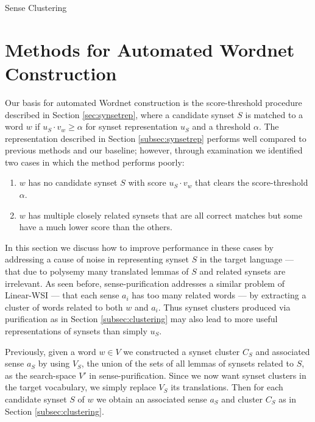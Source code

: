 \documentclass{book}
\begin{document}
\begin{algorithm}[H]
\label{alg:clustering}
\SetAlgoLined
\SetAlgoNoEnd
{}
\caption{Sense Clustering}
\end{algorithm}

\section{Methods for Automated Wordnet Construction}
\label{sec:wordnet}

Our basis for automated Wordnet construction is the score-threshold procedure described in Section \ref{sec:synsetrep}, where a candidate synset $S$ is matched to a word $w$ if $u_S\cdot v_w\ge\alpha$ for synset representation $u_S$ and a threshold $\alpha$.
The representation described in Section \ref{subsec:synsetrep} performs well compared to previous methods and our baseline;
however, through examination we identified two cases in which the method performs poorly: 
\begin{enumerate}
\item $w$ has no candidate synset $S$ with score $u_S\cdot v_w$ that clears the score-threshold $\alpha$.
\item $w$ has multiple closely related synsets that are all correct matches but some have a much lower score than the others.
\end{enumerate}
In this section we discuss how to improve performance in these cases by addressing a cause of noise in representing synset $S$ in the target language --- that due to polysemy many translated lemmas of $S$ and related synsets are irrelevant.
As seen before, sense-purification addresses a similar problem of Linear-WSI --- that each sense $a_i$ has too many related words --- by extracting a cluster of words related to both $w$ and $a_i$.
Thus synset clusters produced via purification as in Section \ref{subsec:clustering} may also lead to more useful representations of synsets than simply $u_S$.

Previously, given a word $w\in V$ we constructed a synset cluster $C_S$ and associated sense $a_S$ by using $V_S$, the union of the sets of all lemmas of synsets related to $S$, as the search-space $V'$ in sense-purification.
Since we now want synset clusters in the target vocabulary, we simply replace $V_S$ its translations.
Then for each candidate synset $S$ of $w$ we obtain an associated sense $a_S$ and cluster $C_S$ as in Section \ref{subsec:clustering}.
\end{document}
